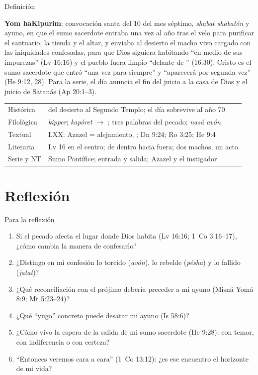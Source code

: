 \begin{frame}{Definición}
\begin{tcolorbox}[colback=papiro,colframe=tierraroja,boxrule=1pt,arc=3pt,fontupper=\scriptsize]
\textbf{Yom haKipurim}: convocación santa del 10 del mes séptimo, \emph{shabat shabatón} y ayuno, en que el sumo sacerdote entraba una vez al año tras el velo para purificar el santuario, la tienda y el altar, y enviaba al desierto el macho vivo cargado con las iniquidades confesadas, para que Dios siguiera habitando ``en medio de sus impurezas'' (Lv 16:16) y el pueblo fuera limpio ``delante de \SENOR'' (16:30). Cristo es el sumo sacerdote que entró ``una vez para siempre'' y ``aparecerá por segunda vez'' (He 9:12, 28). Para la serie, el día anuncia el fin del juicio a la casa de Dios y el juicio de Satanás (Ap 20:1--3).
\end{tcolorbox}
\tiny\renewcommand{\arraystretch}{1.1}
\begin{tabular}{@{}L{2.0cm}L{9.6cm}@{}}
\toprule
Histórica & del desierto al Segundo Templo; el día sobrevive al año 70 \\
Filológica & \emph{kipper}; \emph{kapóret} $\rightarrow$ ; tres palabras del pecado; \emph{nasá avón} \\
Textual & LXX: Azazel = alejamiento, ; Dn 9:24; Ro 3:25; He 9:4 \\
Literaria & Lv 16 en el centro; de dentro hacia fuera; dos machos, un acto \\
Serie y NT & Sumo Pontífice; entrada y salida; Azazel y el instigador \\
\bottomrule
\end{tabular}
\end{frame}

\section{Reflexión}

\begin{frame}{Para la reflexión}
\small
\begin{enumerate}\setlength{\itemsep}{3pt}
\item Si el pecado afecta el lugar donde Dios habita (Lv 16:16; 1~Co 3:16--17), ¿cómo cambia la manera de confesarlo?
\item ¿Distingo en mi confesión lo torcido (\emph{avón}), lo rebelde (\emph{pésha}) y lo fallido (\emph{jatat})?
\item ¿Qué reconciliación con el prójimo debería preceder a mi ayuno (Misná Yomá 8:9; Mt 5:23--24)?
\item ¿Qué ``yugo'' concreto puede desatar mi ayuno (Is 58:6)?
\item ¿Cómo vivo la espera de la salida de mi sumo sacerdote (He 9:28): con temor, con indiferencia o con certeza?
\item ``Entonces veremos cara a cara'' (1~Co 13:12): ¿es ese encuentro el horizonte de mi vida?
\end{enumerate}
\end{frame}

